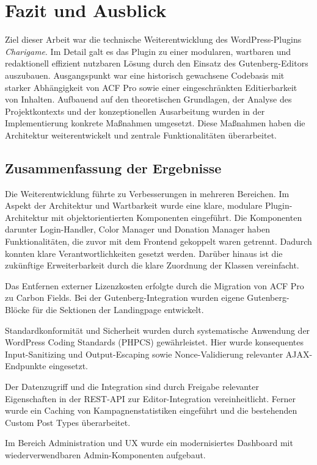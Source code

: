 \chapter{Fazit und Ausblick}
\label{ch:fazit-und-ausblick}

Ziel dieser Arbeit war die technische Weiterentwicklung des WordPress-Plugins \textit{Charigame}.
Im Detail galt es das Plugin zu einer modularen, wartbaren und redaktionell effizient nutzbaren Lösung durch den Einsatz des Gutenberg-Editors auszubauen.
Ausgangspunkt war eine historisch gewachsene Codebasis mit starker Abhängigkeit von ACF Pro sowie einer eingeschränkten Editierbarkeit von Inhalten.
Aufbauend auf den theoretischen Grundlagen, der Analyse des Projektkontexts und der konzeptionellen Ausarbeitung wurden in der Implementierung konkrete Maßnahmen umgesetzt.
Diese Maßnahmen haben die Architektur weiterentwickelt und zentrale Funktionalitäten überarbeitet.

\section{Zusammenfassung der Ergebnisse}
Die Weiterentwicklung führte zu Verbesserungen in mehreren Bereichen.
Im Aspekt der Architektur und Wartbarkeit wurde eine klare, modulare Plugin-Architektur mit objektorientierten Komponenten eingeführt.
Die Komponenten darunter Login-Handler, Color Manager und Donation Manager haben Funktionalitäten, die zuvor mit dem Frontend gekoppelt waren getrennt.
Dadurch konnten klare Verantwortlichkeiten gesetzt werden.
Darüber hinaus ist die zukünftige Erweiterbarkeit durch die klare Zuordnung der Klassen vereinfacht.

Das Entfernen externer Lizenzkosten erfolgte durch die Migration von ACF Pro zu Carbon Fields.
Bei der Gutenberg-Integration wurden eigene Gutenberg-Blöcke für die Sektionen der Landingpage entwickelt.

Standardkonformität und Sicherheit wurden durch systematische Anwendung der WordPress Coding Standards (PHPCS) gewährleistet.
Hier wurde konsequentes Input-Sanitizing und Output-Escaping sowie Nonce-Validierung relevanter AJAX-Endpunkte eingesetzt.

Der Datenzugriff und die Integration sind durch Freigabe relevanter Eigenschaften in der REST-API zur Editor-Integration vereinheitlicht.
Ferner wurde ein Caching von Kampagnenstatistiken eingeführt und die bestehenden Custom Post Types überarbeitet.

Im Bereich Administration und UX wurde ein modernisiertes Dashboard mit wiederverwendbaren Admin-Komponenten aufgebaut.

